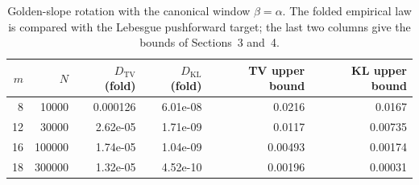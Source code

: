 \begin{table}[t]
\centering
\small
\begin{tabular}{rrrrrr}
\toprule
$m$ & $N$ & $D_{\mathrm{TV}}$ (fold) & $D_{\mathrm{KL}}$ (fold) & TV upper bound & KL upper bound\\
\midrule
8 & 10000 & 0.000126 & 6.01e-08 & 0.0216 & 0.0167\\
12 & 30000 & 2.62e-05 & 1.71e-09 & 0.0117 & 0.00735\\
16 & 100000 & 1.74e-05 & 1.04e-09 & 0.00493 & 0.00174\\
18 & 300000 & 1.32e-05 & 4.52e-10 & 0.00196 & 0.00031\\
\bottomrule
\end{tabular}
\caption{Golden-slope rotation with the canonical window \(\beta=\alpha\).
The folded empirical law is compared with the Lebesgue pushforward target; the
last two columns give the bounds of Sections~3 and~4.}
\label{tab:rotation-folded-kl-certificate}
\end{table}
